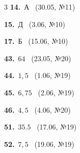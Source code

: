 \documentclass[12pt]{article}
\begin{document}
\ifshowsolutions
{}
\begin{multicols}{3}\noindent
\noindent\textbf{14.}~А \ {\scriptsize\color{gray}(30.05, №11)}\par
\noindent\textbf{15.}~Д \ {\scriptsize\color{gray}(3.06, №10)}\par
\noindent\textbf{17.}~Б \ {\scriptsize\color{gray}(15.06, №10)}\par
\noindent\textbf{43.}~$64$ \ {\scriptsize\color{gray}(23.05, №20)}\par
\noindent\textbf{44.}~$1{,}5$ \ {\scriptsize\color{gray}(1.06, №19)}\par
\noindent\textbf{45.}~$6{,}75$ \ {\scriptsize\color{gray}(2.06, №19)}\par
\noindent\textbf{46.}~$4{,}5$ \ {\scriptsize\color{gray}(4.06, №20)}\par
\noindent\textbf{51.}~$35.5$ \ {\scriptsize\color{gray}(17.06, №19)}\par
\noindent\textbf{52.}~$7{,}5$ \ {\scriptsize\color{gray}(19.06, №19)}\par
\end{multicols}
\fi

\endgroup
\end{document}
